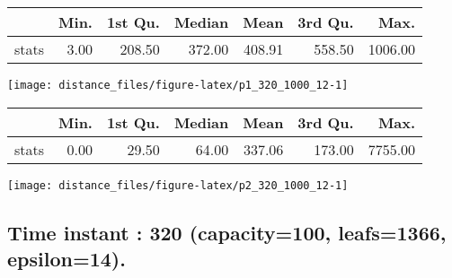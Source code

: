 \documentclass[
  9pt,
  landscape]{article}
\begin{document}
\begin{minipage}{0.5\textwidth} 
\centering 
\begin{tabular}{rrrrrrr}
  \hline
 & Min. & 1st Qu. & Median & Mean & 3rd Qu. & Max. \\ 
  \hline
stats & 3.00 & 208.50 & 372.00 & 408.91 & 558.50 & 1006.00 \\ 
   \hline
\end{tabular}
\vspace{0.5cm} 


\texttt{[image: distance\_files/figure-latex/p1\_320\_1000\_12-1]} 

\end{minipage} 
\begin{minipage}{0.5\textwidth} 
\centering 
\begin{tabular}{rrrrrrr}
  \hline
 & Min. & 1st Qu. & Median & Mean & 3rd Qu. & Max. \\ 
  \hline
stats & 0.00 & 29.50 & 64.00 & 337.06 & 173.00 & 7755.00 \\ 
   \hline
\end{tabular}
\vspace{0.5cm} 


\texttt{[image: distance\_files/figure-latex/p2\_320\_1000\_12-1]} 

\end{minipage}

\pagebreak

\hypertarget{time-instant-320-capacity100-leafs1366-epsilon14.}{%
\subsection{Time instant : 320 (capacity=100, leafs=1366,
epsilon=14).}\label{time-instant-320-capacity100-leafs1366-epsilon14.}}
\end{document}
